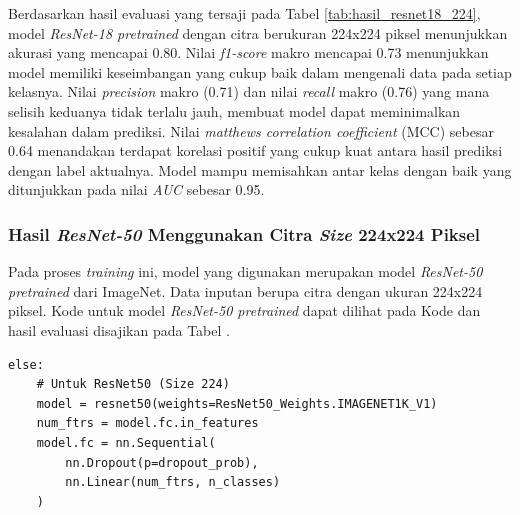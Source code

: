 Berdasarkan hasil evaluasi yang tersaji pada Tabel \ref{tab:hasil_resnet18_224}, 
model \textit{ResNet-18 pretrained} dengan citra berukuran 224x224 piksel 
menunjukkan akurasi yang mencapai 0.80. Nilai \textit{f1-score} makro 
mencapai 0.73 menunjukkan model memiliki keseimbangan yang cukup baik 
dalam mengenali data pada setiap kelasnya. Nilai \textit{precision} makro 
(0.71) dan nilai \textit{recall} makro (0.76) yang mana selisih keduanya 
tidak terlalu jauh, membuat model dapat meminimalkan kesalahan dalam prediksi. 
Nilai \textit{matthews correlation coefficient} (MCC) sebesar 0.64 
menandakan terdapat korelasi positif yang cukup kuat antara hasil prediksi 
dengan label aktualnya. Model mampu memisahkan antar kelas dengan baik 
yang ditunjukkan pada nilai \textit{AUC} sebesar 0.95. \par


\subsubsection{Hasil \textit{ResNet-50} Menggunakan Citra \textit{Size} 224x224 Piksel} \label{IV.Resnet50_224}
Pada proses \textit{training} ini, model yang digunakan merupakan model 
\textit{ResNet-50 pretrained} dari ImageNet. Data inputan berupa citra 
dengan ukuran 224x224 piksel. Kode untuk model \textit{ResNet-50 pretrained} 
dapat dilihat pada Kode dan hasil evaluasi disajikan pada Tabel . \par 

\begin{lstlisting}[caption={Kode ResNet-50 224x224}, label={code:4.kode_resnet50_224}]
else:
    # Untuk ResNet50 (Size 224)
    model = resnet50(weights=ResNet50_Weights.IMAGENET1K_V1)
    num_ftrs = model.fc.in_features
    model.fc = nn.Sequential(
        nn.Dropout(p=dropout_prob),
        nn.Linear(num_ftrs, n_classes)
    )
\end{lstlisting}


